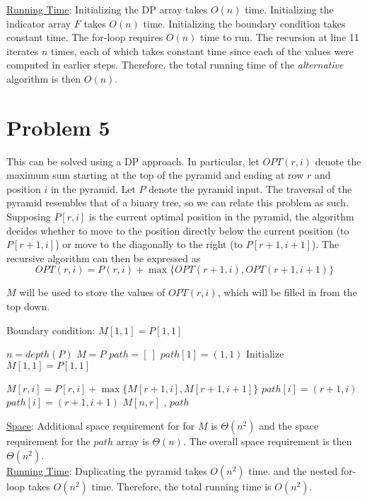 \documentclass[twoside,11pt]{homework}
\newcommand\NoProc{\renewcommand\algorithmicprocedure{}}
\begin{document}
\noindent
\underline{Running Time}: Initializing the DP array takes $O(n)$ time.  Initializing the indicator array $F$ takes $O(n)$ time.  Initializing the boundary condition takes constant time. The for-loop requires $O(n)$ time to run.   The  recursion at line 11 iterates $n$ times, each of which takes constant time since each of the values were computed in earlier steps.   Therefore, the total running time of the \textit{alternative} algorithm is then $O(n)$. 


\section*{Problem 5}
This can be solved using a DP approach.  In particular, let $OPT(r, i)$ denote the maximum sum starting at the top of the pyramid and ending at row $r$ and position $i$ in the pyramid.  Let $P$ denote the pyramid input.  The traversal of the pyramid resembles that of a binary tree,  so we can relate this problem as such.  Supposing $P[r, i]$ is the current optimal position in the pyramid,  the algorithm decides whether to move to the position directly below the current position (to $P[r+1, i]$) or move to the diagonally to the right (to $P[r+1, i+1]$).  The recursive algorithm can then be expressed as 
$$OPT(r, i) = P(r,i) + \max \{OPT(r+1, i),  OPT(r+1, i+1) \}$$

\noindent
$M$ will be used to store the values of $OPT(r, i)$,  which will be filled in from the top down. 

\noindent
Boundary condition: $M[1,1] = P[1,1]$

\begin{algorithm}
\begin{algorithmic}[1]
\NoProc
{}
\State $n = depth(P)$   
\State $M = P$    %
\State $path = [ \ ]$  
\State $path[1] = (1,1)$ 
\State Initialize $M[1,1] = P[1,1]$    

\State $M[r, i] = P[r, i] + \max \{ M[r+1, i] ,  M[r+1, i+1] \}$
 
\State $path[i] =  (r+1, i)$  
\State  $path[i] =  (r+1, i+1)$ 
\EndIf
\EndFor
\EndFor
\State \Return $M[n,r]$ ,  $path$  
\EndProcedure
\end{algorithmic}
\end{algorithm}

\noindent
\underline{Space}:   Additional space requirement for for $M$ is $\Theta(n^2)$ and the space requirement for the $path$ array is $\Theta(n)$.  The overall space requirement is then $\Theta(n^2)$.  \\


\noindent
\underline{Running Time}:  Duplicating the pyramid takes $O(n^2)$ time.   and the nested for-loop takes $O(n^2)$ time. Therefore, the total running time is $O(n^2)$.
\end{document}
